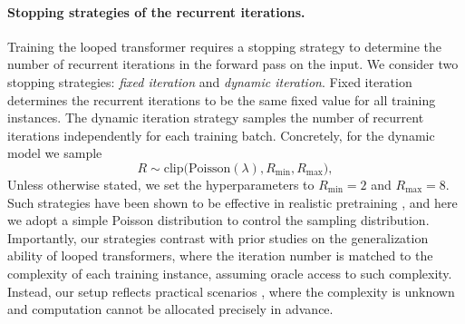 \documentclass{article} %
\newcommand{\yy}[1]{\textcolor{blue}{[Yuekun: #1]}}
\begin{document}

\paragraph{Stopping strategies of the recurrent iterations.} Training the looped transformer requires a stopping strategy to determine the number of recurrent iterations in the forward pass on the input. 
We consider two stopping strategies: \textit{fixed iteration} and \textit{dynamic iteration}. 
Fixed iteration determines the recurrent iterations to be the same fixed value for all training instances.
The dynamic iteration strategy samples the number of recurrent iterations independently for each training batch. Concretely, for the dynamic model we sample
\[
R \sim \mathrm{clip}\big(\mathrm{Poisson}(\lambda), R_{\min}, R_{\max}\big),
\]
Unless otherwise stated, we set the hyperparameters to \(R_{\min}=2\) and \(R_{\max}=8\).
Such strategies have been shown to be effective in realistic pretraining \citep{geiping2025scaling, zhu2025scaling}, and here we adopt a simple Poisson distribution to control the sampling distribution.
Importantly, our strategies contrast with prior studies on the generalization ability of looped transformers, where the iteration number is matched to the complexity of each training instance, assuming oracle access to such complexity.
Instead, our setup reflects practical scenarios \citep{geiping2025scaling}, where the complexity is unknown and computation cannot be allocated precisely in advance.
\end{document}
